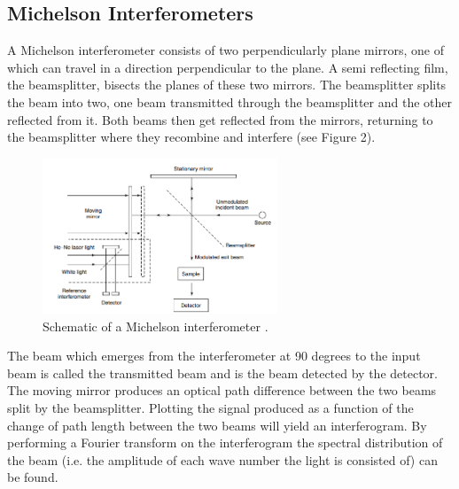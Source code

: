 \documentclass[reprint,amsmath,amssymb,aps, prl]{revtex4-2}
\begin{document}
\subsection{Michelson Interferometers}
A Michelson interferometer consists of two perpendicularly plane mirrors, one of which can travel in a direction perpendicular to the plane.
A semi reflecting film, the beamsplitter, bisects the planes of these two mirrors. The beamsplitter splits the beam into two, one beam transmitted through the beamsplitter and the other reflected from it. Both beams then get reflected from the mirrors, returning to the beamsplitter where they recombine and interfere \cite{stuart} (see Figure 2). 
\begin{figure}[h]
    \includegraphics[width=7cm]{Images/INTERFEROMETER.png}
    \caption{Schematic of a Michelson interferometer \cite{stuart}.}
    \label{fig:Interferometer}
    \centering
\end{figure}
The beam which emerges from the interferometer at 90 degrees to the input beam is called the transmitted beam and is the beam detected by the detector.
The moving mirror produces an optical path difference between the two beams split by the beamsplitter.
Plotting the signal produced
as a function of the change of
path length between the two beams will yield
an interferogram. By performing a Fourier transform on the interferogram the spectral distribution of the beam (i.e. the amplitude of each wave number the light is consisted of)
can be found.
\end{document}
